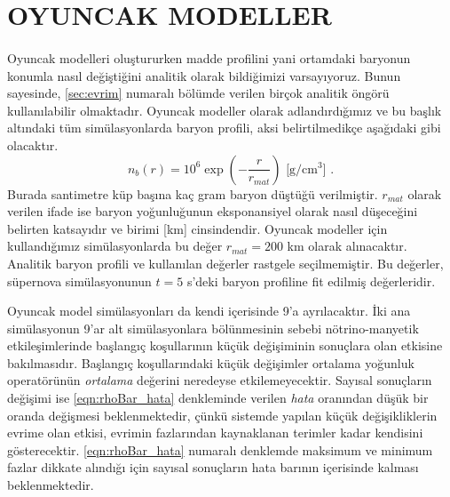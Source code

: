 \section{OYUNCAK MODELLER}\label{sec:OyuncakModel}
\paragraph{}
Oyuncak modelleri oluştururken madde profilini yani ortamdaki baryonun konumla nasıl değiştiğini analitik olarak bildiğimizi varsayıyoruz. Bunun sayesinde, \ref{sec:evrim} numaralı bölümde verilen birçok analitik öngörü kullanılabilir olmaktadır. Oyuncak modeller olarak adlandırdığımız ve bu başlık altındaki tüm simülasyonlarda baryon profili, aksi belirtilmedikçe aşağıdaki gibi olacaktır.
\begin{equation}
    n_{b}(r) = 10^{6} \exp(-\frac{r}{r_{mat}}) \text{ [g/cm$^3$] .}
\end{equation}
Burada santimetre küp başına kaç gram baryon düştüğü verilmiştir. $ r_{mat} $ olarak verilen ifade ise baryon yoğunluğunun eksponansiyel olarak nasıl düşeceğini belirten katsayıdır ve birimi [km] cinsindendir. Oyuncak modeller için kullandığımız simülasyonlarda bu değer $ r_{mat}=200 $ km olarak alınacaktır. Analitik baryon profili ve kullanılan değerler rastgele seçilmemiştir. Bu değerler, süpernova simülasyonunun $ t=5 $ s'deki baryon profiline fit edilmiş değerleridir.

Oyuncak model simülasyonları da kendi içerisinde 9'a ayrılacaktır. İki ana simülasyonun 9'ar alt simülasyonlara bölünmesinin sebebi nötrino-manyetik etkileşimlerinde başlangıç koşullarının küçük değişiminin sonuçlara olan etkisine bakılmasıdır. Başlangıç koşullarındaki küçük değişimler ortalama yoğunluk operatörünün \emph{ortalama} değerini neredeyse etkilemeyecektir. Sayısal sonuçların değişimi ise \eqref{eqn:rhoBar_hata} denkleminde verilen \emph{hata} oranından düşük bir oranda değişmesi beklenmektedir, çünkü sistemde yapılan küçük değişikliklerin evrime olan etkisi, evrimin fazlarından kaynaklanan terimler kadar kendisini gösterecektir. \eqref{eqn:rhoBar_hata} numaralı denklemde maksimum ve minimum fazlar dikkate alındığı için sayısal sonuçların hata barının içerisinde kalması beklenmektedir. 

